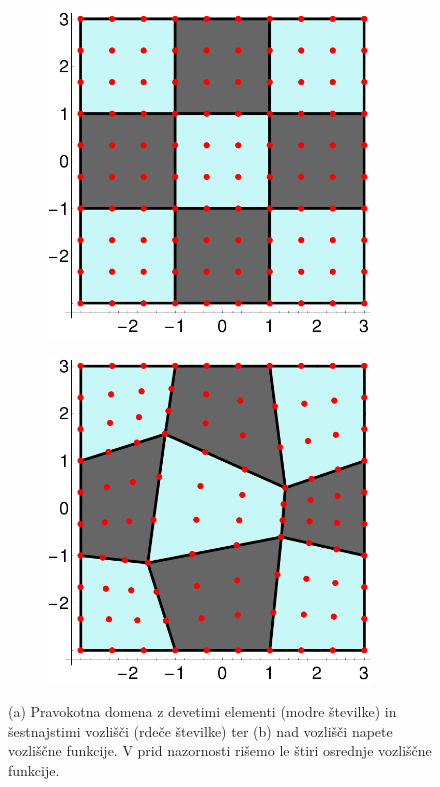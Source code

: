 \begin{figure}[ht]
   \centering
    \begin{subfigure}[b]{0.42\textwidth}
        \centering
        \includegraphics[width=0.94\textwidth]{Slike/layout2d}
        \vspace{0mm}
        \caption{}
    \end{subfigure}
    \hspace{5mm}
    \begin{subfigure}[b]{0.42\textwidth}
        \centering
        \includegraphics[width=0.94\textwidth]{Slike/layout2dTrans}
        \caption{}
    \end{subfigure}
    \caption{(a) Pravokotna domena z devetimi elementi (modre številke) in šestnajstimi vozlišči (rdeče številke) ter (b) nad vozlišči napete vozliščne funkcije. V prid nazornosti rišemo le štiri osrednje vozliščne funkcije.}
    \label{fig:regionAndNodeFunctions}
\end{figure}

